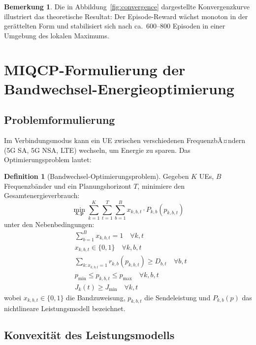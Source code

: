 ﻿\documentclass[a4paper,12pt]{article}
\theoremstyle{definition}
\newtheorem{definition}{Definition}
\newtheorem{bemerkung}{Bemerkung}
\begin{document}
\begin{bemerkung}
  Die in Abbildung~\ref{fig:convergence} dargestellte Konvergenzkurve illustriert das theoretische
  Resultat: Der Episode-Reward w\"achst monoton in der ger\"attelten Form und stabilisiert sich
  nach ca.\ 600--800 Episoden in einer Umgebung des lokalen Maximums.
\end{bemerkung}

\section{MIQCP-Formulierung der Bandwechsel-Energieoptimierung}
\label{sec:miqcp}

\subsection{Problemformulierung}

Im Verbindungsmodus kann ein UE zwischen verschiedenen FrequenzbÃ¤ndern (5G SA, 5G NSA, LTE)
wechseln, um Energie zu sparen. Das Optimierungsproblem lautet:

\begin{definition}[Bandwechsel-Optimierungsproblem]
  Gegeben $K$ UEs, $B$ F\"requenzb\"ander und ein Planungshorizont $T$, minimiere den
  Gesamtenergieverbrauch:
  \[
    \min_{\mathbf{x}, \mathbf{p}} \sum_{k=1}^{K} \sum_{t=1}^{T}
    \sum_{b=1}^{B} x_{k,b,t} \cdot P_{k,b}(p_{k,b,t})
  \]
  unter den Nebenbedingungen:
  \begin{align}
    &\sum_{b=1}^{B} x_{k,b,t} = 1 \quad \forall k, t \label{eq:assign}\\
    &x_{k,b,t} \in \{0,1\} \quad \forall k, b, t \label{eq:binary}\\
    &\sum_{k: x_{k,b,t}=1} r_{k,b}(p_{k,b,t}) \geq D_{b,t} \quad \forall b, t \label{eq:demand}\\
    &p_{\min} \leq p_{k,b,t} \leq p_{\max} \quad \forall k, b, t \label{eq:power_lim}\\
    &J_k(t) \geq J_{\min} \quad \forall k, t \label{eq:fairness}
  \end{align}
  wobei $x_{k,b,t} \in \{0,1\}$ die Bandzuweisung, $p_{k,b,t}$ die Sendeleistung und
  $P_{k,b}(p)$ das nichtlineare Leistungsmodell bezeichnet.
\end{definition}

\subsection{Konvexit\"at des Leistungsmodells}
\end{document}
